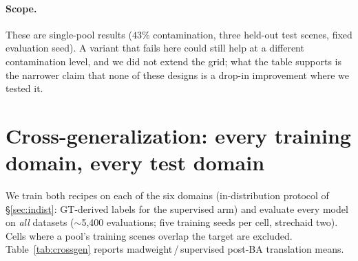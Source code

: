 \documentclass{article}
\newcommand{\mad}{madweight}
\begin{document}
\paragraph{Scope.} These are single-pool results ($43\%$ contamination, three held-out
test scenes, fixed evaluation seed). A variant that fails here could still help at a
different contamination level, and we did not extend the grid; what the table supports
is the narrower claim that none of these designs is a drop-in improvement where we
tested it.

\section{Cross-generalization: every training domain, every test domain}\label{app:crossgen}
We train both recipes on each of the six domains (in-distribution protocol of
\S\ref{sec:indist}: GT-derived labels for the supervised arm) and evaluate every model
on \emph{all} datasets ($\sim$5{,}400 evaluations; five training seeds per cell,
strechaid two). Cells where a pool's training scenes overlap the target are excluded.
Table~\ref{tab:crossgen} reports \mad{}\,/\,supervised post-BA translation means.

\begin{table}[t]\centering\footnotesize
\caption{\textbf{Cross-generalization grid}: rows = training domain, columns = test
dataset; each cell \mad{}\,/\,supervised (mean$\pm$std over training seeds). Diagonal
(*) = held-out in-distribution test (Table~\ref{tab:indist}); ``leak'' = training
scenes overlap the target.}
\label{tab:crossgen}
\setlength{\tabcolsep}{2.5pt}%
\end{table}
\end{document}
